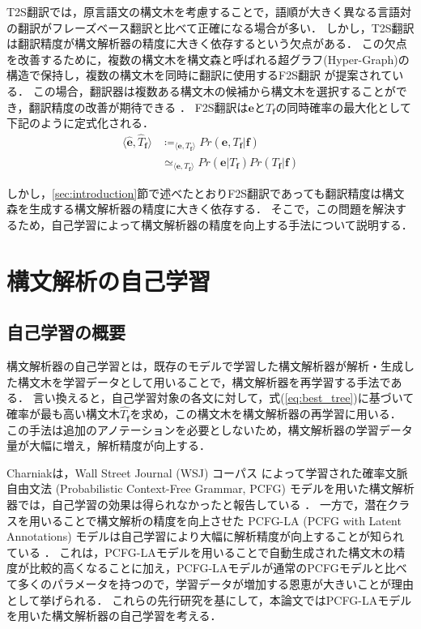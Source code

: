 \documentclass[japanese]{jnlp_1.4}
\newcommand{\argmax}{}
\begin{document}
T2S翻訳では，原言語文の構文木を考慮することで，語順が大きく異なる言語対の翻訳がフレーズベース翻訳と比べて正確になる場合が多い．
しかし，T2S翻訳は翻訳精度が構文解析器の精度に大きく依存するという欠点がある．
この欠点を改善するために，複数の構文木を構文森と呼ばれる超グラフ(Hyper-Graph)の構造で保持し，複数の構文木を同時に翻訳に使用するF2S翻訳 \cite{mi08forestrule} が提案されている．
この場合，翻訳器は複数ある構文木の候補から構文木を選択することができ，翻訳精度の改善が期待できる \cite{zhang12helporhurt}．
F2S翻訳は$\bm{e}$と$T_{\bm{f}}$の同時確率の最大化として下記のように定式化される．
\begin{align}
\label{eq:forest_to_string}
\langle \hat{\bm{e}}, \hat{T}_{\bm{f}} \rangle &\coloneqq \argmax_{\langle \bm{e}, T_{\bm{f}} \rangle} Pr(\bm{e}, T_{\bm{f}}|\bm{f}) \\
&\simeq \argmax_{\langle \bm{e}, T_{\bm{f}} \rangle} Pr(\bm{e}|T_{\bm{f}}) Pr(T_{\bm{f}}|\bm{f})
\end{align}

しかし，\ref{sec:introduction}節で述べたとおりF2S翻訳であっても翻訳精度は構文森を生成する構文解析器の精度に大きく依存する．
そこで，この問題を解決するため，自己学習によって構文解析器の精度を向上する手法について説明する．


\section{構文解析の自己学習}

\subsection{自己学習の概要}

構文解析器の自己学習とは，既存のモデルで学習した構文解析器が解析・生成した構文木を学習データとして用いることで，構文解析器を再学習する手法である．
言い換えると，自己学習対象の各文に対して，式(\ref{eq:best_tree})に基づいて確率が最も高い構文木$\hat{T_{\bm{f}}}$を求め，この構文木を構文解析器の再学習に用いる．
この手法は追加のアノテーションを必要としないため，構文解析器の学習データ量が大幅に増え，解析精度が向上する．

Charniakは，Wall Street Journal (WSJ) コーパス \cite{marcus93penntreebank} によって学習された確率文脈自由文法 (Probabilistic Context-Free Grammar, PCFG) モデルを用いた構文解析器では，自己学習の効果は得られなかったと報告している \cite{Charniak97}．
一方で，潜在クラスを用いることで構文解析の精度を向上させた PCFG-LA (PCFG with Latent Annotations) モデルは自己学習により大幅に解析精度が向上することが知られている \cite{huang2009self}．
これは，PCFG-LAモデルを用いることで自動生成された構文木の精度が比較的高くなることに加え，PCFG-LAモデルが通常のPCFGモデルと比べて多くのパラメータを持つので，学習データが増加する恩恵が大きいことが理由として挙げられる．
これらの先行研究を基にして，本論文ではPCFG-LAモデルを用いた構文解析器の自己学習を考える．
\end{document}
